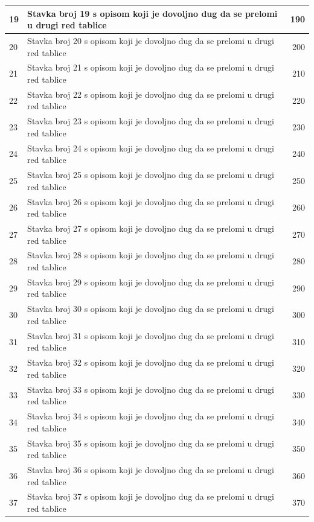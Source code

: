 \documentclass[a4paper]{article}
\begin{document}
\begin{longtable}{|l|p{6cm}|r|}
\hline
19 & Stavka broj 19 s opisom koji je dovoljno dug da se prelomi u drugi red tablice & 190 \\
\hline
20 & Stavka broj 20 s opisom koji je dovoljno dug da se prelomi u drugi red tablice & 200 \\
\hline
21 & Stavka broj 21 s opisom koji je dovoljno dug da se prelomi u drugi red tablice & 210 \\
\hline
22 & Stavka broj 22 s opisom koji je dovoljno dug da se prelomi u drugi red tablice & 220 \\
\hline
23 & Stavka broj 23 s opisom koji je dovoljno dug da se prelomi u drugi red tablice & 230 \\
\hline
24 & Stavka broj 24 s opisom koji je dovoljno dug da se prelomi u drugi red tablice & 240 \\
\hline
25 & Stavka broj 25 s opisom koji je dovoljno dug da se prelomi u drugi red tablice & 250 \\
\hline
26 & Stavka broj 26 s opisom koji je dovoljno dug da se prelomi u drugi red tablice & 260 \\
\hline
27 & Stavka broj 27 s opisom koji je dovoljno dug da se prelomi u drugi red tablice & 270 \\
\hline
28 & Stavka broj 28 s opisom koji je dovoljno dug da se prelomi u drugi red tablice & 280 \\
\hline
29 & Stavka broj 29 s opisom koji je dovoljno dug da se prelomi u drugi red tablice & 290 \\
\hline
30 & Stavka broj 30 s opisom koji je dovoljno dug da se prelomi u drugi red tablice & 300 \\
\hline
31 & Stavka broj 31 s opisom koji je dovoljno dug da se prelomi u drugi red tablice & 310 \\
\hline
32 & Stavka broj 32 s opisom koji je dovoljno dug da se prelomi u drugi red tablice & 320 \\
\hline
33 & Stavka broj 33 s opisom koji je dovoljno dug da se prelomi u drugi red tablice & 330 \\
\hline
34 & Stavka broj 34 s opisom koji je dovoljno dug da se prelomi u drugi red tablice & 340 \\
\hline
35 & Stavka broj 35 s opisom koji je dovoljno dug da se prelomi u drugi red tablice & 350 \\
\hline
36 & Stavka broj 36 s opisom koji je dovoljno dug da se prelomi u drugi red tablice & 360 \\
\hline
37 & Stavka broj 37 s opisom koji je dovoljno dug da se prelomi u drugi red tablice & 370 \\

\end{longtable}
\end{document}
